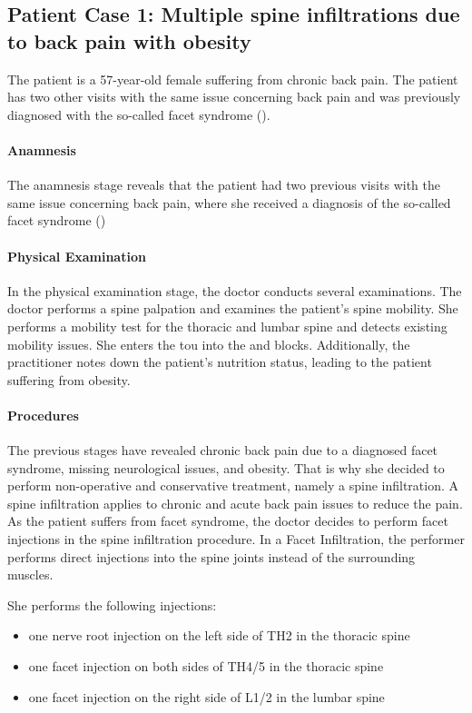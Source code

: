 \subsection{Patient Case 1: Multiple spine infiltrations due to back pain with obesity}\label{subsec:patient-a---multiple-spine-infiltrations-due-to-backpain-with-obesity}
The patient is a 57-year-old female suffering from chronic back pain.
The patient has two other visits with the same issue concerning back pain and was previously diagnosed with the so-called facet syndrome ().

\paragraph{Anamnesis}
The anamnesis stage reveals that the patient had two previous visits with the same issue concerning back pain, where she received a diagnosis of the so-called facet syndrome ()

\paragraph{Physical Examination}
In the physical examination stage, the doctor conducts several examinations.
The doctor performs a spine palpation and examines the patient's spine mobility.
She performs a mobility test for the thoracic and lumbar spine and detects existing mobility issues.
She enters the tou into the  and  blocks.
Additionally, the practitioner notes down the patient's nutrition status, leading to the patient suffering from obesity.

\paragraph{Procedures}
The previous stages have revealed chronic back pain due to a diagnosed facet syndrome, missing neurological issues, and obesity.
That is why she decided to perform non-operative and conservative treatment, namely a spine infiltration.
A spine infiltration applies to chronic and acute back pain issues to reduce the pain.
As the patient suffers from facet syndrome, the doctor decides to perform facet injections in the spine infiltration procedure.
In a Facet Infiltration, the performer performs direct injections into the spine joints instead of the surrounding muscles.

She performs the following injections:
\begin{itemize}
    \item one nerve root injection on the left side of TH2 in the thoracic spine
    \item one facet injection on both sides of TH4/5 in the thoracic spine
    \item one facet injection on the right side of L1/2 in the lumbar spine
\end{itemize}

